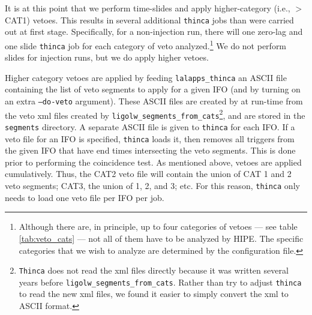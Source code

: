 It is at this point that we perform time-slides and apply higher-category (i.e., $>$ CAT1) vetoes. This results in several additional \texttt{thinca} jobs than were carried out at first stage. Specifically, for a non-injection run, there will one zero-lag and one slide \texttt{thinca} job for each category of veto analyzed.\footnote{Although there are, in principle, up to four categories of vetoes --- see table \ref{tab:veto_cats} --- not all of them have to be analyzed by \ac{HIPE}. The specific categories that we wish to analyze are determined by the configuration file.} We do not perform slides for injection runs, but we do apply higher vetoes.

Higher category vetoes are applied by feeding \texttt{lalapps\_thinca} an ASCII file containing the list of veto segments to apply for a given \ac{IFO} (and by turning on an extra \texttt{--do-veto} argument). These ASCII files are created by \ihope at run-time from the veto xml files created by \texttt{ligolw\_segments\_from\_cats}\footnote{\texttt{Thinca} does not read the xml files directly because it was written several years before \texttt{ligolw\_segments\_from\_cats}. Rather than try to adjust \texttt{thinca} to read the new xml files, we found it easier to simply convert the xml to ASCII format.}, and are stored in the \texttt{segments} directory. A separate ASCII file is given to \texttt{thinca} for each \ac{IFO}. If a veto file for an \ac{IFO} is specified, \texttt{thinca} loads it, then removes all triggers from the given \ac{IFO} that have end times intersecting the veto segments. This is done prior to performing the coincidence test. As mentioned above, vetoes are applied cumulatively. Thus, the CAT2 veto file will contain the union of CAT 1 and 2 veto segments; CAT3, the union of 1, 2, and 3; etc. For this reason, \texttt{thinca} only needs to load one veto file per \ac{IFO} per job.

